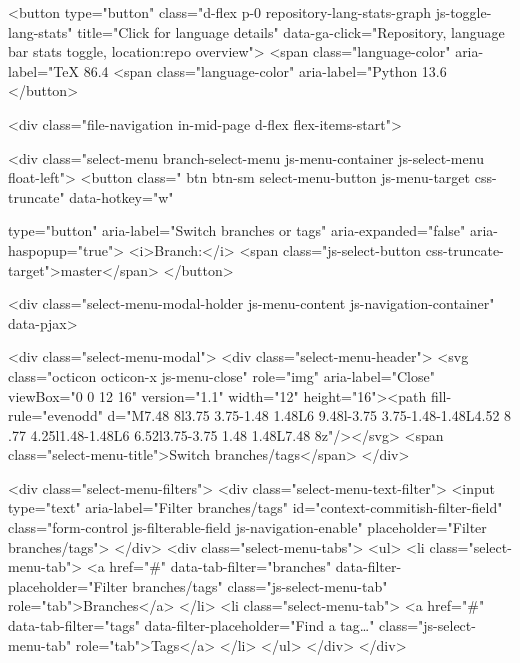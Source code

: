     <button type="button" class="d-flex p-0 repository-lang-stats-graph js-toggle-lang-stats" title="Click for language details" data-ga-click="Repository, language bar stats toggle, location:repo overview">
      <span class="language-color" aria-label="TeX 86.4%
      <span class="language-color" aria-label="Python 13.6%
  </button>




  <div class="file-navigation in-mid-page d-flex flex-items-start">
  
<div class="select-menu branch-select-menu js-menu-container js-select-menu float-left">
  <button class=" btn btn-sm select-menu-button js-menu-target css-truncate" data-hotkey="w"
    
    type="button" aria-label="Switch branches or tags" aria-expanded="false" aria-haspopup="true">
      <i>Branch:</i>
      <span class="js-select-button css-truncate-target">master</span>
  </button>

  <div class="select-menu-modal-holder js-menu-content js-navigation-container" data-pjax>

    <div class="select-menu-modal">
      <div class="select-menu-header">
        <svg class="octicon octicon-x js-menu-close" role="img" aria-label="Close" viewBox="0 0 12 16" version="1.1" width="12" height="16"><path fill-rule="evenodd" d="M7.48 8l3.75 3.75-1.48 1.48L6 9.48l-3.75 3.75-1.48-1.48L4.52 8 .77 4.25l1.48-1.48L6 6.52l3.75-3.75 1.48 1.48L7.48 8z"/></svg>
        <span class="select-menu-title">Switch branches/tags</span>
      </div>

      <div class="select-menu-filters">
        <div class="select-menu-text-filter">
          <input type="text" aria-label="Filter branches/tags" id="context-commitish-filter-field" class="form-control js-filterable-field js-navigation-enable" placeholder="Filter branches/tags">
        </div>
        <div class="select-menu-tabs">
          <ul>
            <li class="select-menu-tab">
              <a href="#" data-tab-filter="branches" data-filter-placeholder="Filter branches/tags" class="js-select-menu-tab" role="tab">Branches</a>
            </li>
            <li class="select-menu-tab">
              <a href="#" data-tab-filter="tags" data-filter-placeholder="Find a tag…" class="js-select-menu-tab" role="tab">Tags</a>
            </li>
          </ul>
        </div>
      </div>

